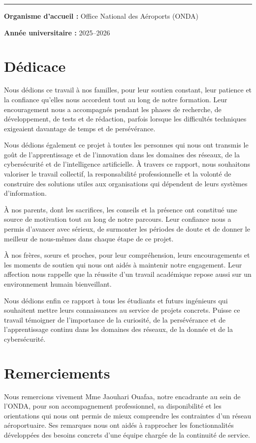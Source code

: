 \documentclass[12pt,a4paper,oneside]{report}
\newcommand{\frontchapter}[1]{%
  \chapter*{#1}%
  \addcontentsline{toc}{chapter}{#1}%
}
\begin{document}
\begin{titlepage}
\vfill
\textcolor{ondaBlue}{\rule{0.72\textwidth}{0.8pt}}\par
\vspace{0.35cm}
{\bfseries Organisme d'accueil :} Office National des Aéroports (ONDA)\par
\vspace{0.15cm}
{\bfseries Année universitaire :} 2025--2026
\end{titlepage}


\frontchapter{Dédicace}
\begin{center}
Nous dédions ce travail à nos familles, pour leur soutien constant, leur patience et la confiance qu’elles nous accordent tout au long de notre formation. Leur encouragement nous a accompagnés pendant les phases de recherche, de développement, de tests et de rédaction, parfois lorsque les difficultés techniques exigeaient davantage de temps et de persévérance.

Nous dédions également ce projet à toutes les personnes qui nous ont transmis le goût de l’apprentissage et de l’innovation dans les domaines des réseaux, de la cybersécurité et de l’intelligence artificielle. À travers ce rapport, nous souhaitons valoriser le travail collectif, la responsabilité professionnelle et la volonté de construire des solutions utiles aux organisations qui dépendent de leurs systèmes d’information.

À nos parents, dont les sacrifices, les conseils et la présence ont constitué une source de motivation tout au long de notre parcours. Leur confiance nous a permis d’avancer avec sérieux, de surmonter les périodes de doute et de donner le meilleur de nous-mêmes dans chaque étape de ce projet.

À nos frères, sœurs et proches, pour leur compréhension, leurs encouragements et les moments de soutien qui nous ont aidés à maintenir notre engagement. Leur affection nous rappelle que la réussite d’un travail académique repose aussi sur un environnement humain bienveillant.

Nous dédions enfin ce rapport à tous les étudiants et futurs ingénieurs qui souhaitent mettre leurs connaissances au service de projets concrets. Puisse ce travail témoigner de l’importance de la curiosité, de la persévérance et de l’apprentissage continu dans les domaines des réseaux, de la donnée et de la cybersécurité.
\end{center}

\frontchapter{Remerciements}
Nous remercions vivement Mme Jaouhari Ouafaa, notre encadrante au sein de l’ONDA, pour son accompagnement professionnel, sa disponibilité et les orientations qui nous ont permis de mieux comprendre les contraintes d’un réseau aéroportuaire. Ses remarques nous ont aidés à rapprocher les fonctionnalités développées des besoins concrets d’une équipe chargée de la continuité de service.
\end{document}
